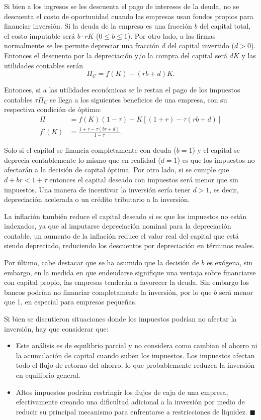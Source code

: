 \documentclass[DeGregorioResumen]{subfiles}
\begin{document}
Si bien a los ingresos se les descuenta el pago de intereses de la deuda, no se descuenta el costo de oportunidad cuando las empresas usan fondos propios para financiar inversión. Si la deuda de la empresa es una fracción $b$ del capital total, el costo imputable será $b\cdot rK$ ($0\leq b \leq 1 $). Por otro lado, a las firmas normalmente se les permite depreciar una fracción $d$ del capital invertido ($d>0$). Entonces el descuento por la depreciación y/o la compra del capital será $dK$ y las utilidades contables serán
\begin{equation*}
\Pi_C=f(K)-(rb+d)K.
\end{equation*}

Entonces, si a las utilidades económicas se le restan el pago de los impuestos contables $\tau\Pi_C $ se llega a los siguientes beneficios de una empresa, con su respectiva condición de óptimo:
\begin{align*}
\Pi &= f(K)(1-\tau) - K[(1+r)-\tau(rb+d)] \\
f'(K) &= \frac{1+r-\tau(br+d)}{1-\tau}.
\end{align*}

Solo si el capital se financia completamente con deuda ($b=1$) y el capital se deprecia contablemente lo mismo que en realidad ($d=1$) es que los impuestos no afectarán a la decisión de capital óptima. Por otro lado, si se cumple que $d+br<1+\tau$ entonces el capital deseado con impuestos será menor que sin impuestos. Una manera de incentivar la inversión sería tener $d>1$, es decir, depreciación acelerada o un crédito tributario a la inversión.

La inflación también reduce el capital deseado si es que los impuestos no están indexados, ya que al imputarse depreciación nominal para la depreciación contable, un aumento de la inflación reduce el valor real del capital que está siendo depreciado, reduciendo los descuentos por depreciación en términos reales.

Por último, cabe destacar que se ha asumido que la decisión de $b$ es exógena, sin embargo, en la medida en que endeudarse signifique una ventaja sobre financiarse con capital propio, las empresas tenderán a favorecer la deuda. Sin embargo los bancos podrían no financiar completamente la inversión, por lo que $b$ será menor que 1, en especial para empresas pequeñas.

Si bien se discutieron situaciones donde los impuestos podrían no afectar la inversión, hay que considerar que:
\begin{itemize}
\item Este análisis es de equilibrio parcial y no considera como cambian el ahorro ni la acumulación de capital cuando suben los impuestos. Los impuestos afectan todo el flujo de retorno del ahorro, lo que probablemente reduzca la inversión en equilibrio general.
\item Altos impuestos podrían restringir los flujos de caja de una empresa, efectivamente creando una dificultad adicional a la inversión por medio de reducir su principal mecanismo para enfrentarse a restricciones de liquidez. $\blacksquare$
\end{itemize}
\end{document}
